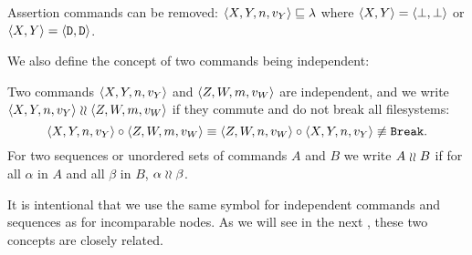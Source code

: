 \begin{myax}\label{ax_assert}
Assertion commands can be removed:
$\langle{X,Y,n,v_Y}\rangle \sqsubseteq \lambda$ where $\langle{X,Y}\rangle=\langle{\bot,\bot}\rangle$ or $\langle{X,Y}\rangle=\langle{\mathtt{D},\mathtt{D}}\rangle$.
\end{myax}



\bigskip

\noindent
We also define the concept of two commands being independent:

\begin{mydef}\label{def_indep}
Two commands $\langle{X,Y,n,v_Y}\rangle$ and $\langle{Z,W,m,v_W}\rangle$ 
are independent, and we write $\langle{X,Y,n,v_Y}\rangle\mathrel{\wr\wr}\langle{Z,W,m,v_W}\rangle$ if 
they commute and do not break all filesystems:
\[ \langle{X,Y,n,v_Y}\rangle\circ\langle{Z,W,m,v_W}\rangle \equiv \langle{Z,W,n,v_W}\rangle\circ\langle{X,Y,n,v_Y}\rangle \not\equiv \mathtt{Break}. \]
For two sequences or unordered sets of commands $A$ and $B$ we write $A\mathrel{\wr\wr} B$ if
for all $\alpha$ in $A$ and all $\beta$ in $B$, $\alpha\mathrel{\wr\wr}\beta$.
\end{mydef}

It is intentional that we use the same symbol for independent commands
and sequences as for incomparable nodes. As we will see in the next
,
these two concepts are closely related.

